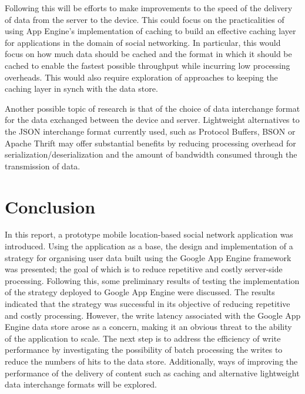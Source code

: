 \documentclass{article}
\begin{document}
Following this will be efforts to make improvements to the speed of the delivery of data from the server to the device. This could focus on the practicalities of using App Engine's implementation of caching to build an effective caching layer for applications in the domain of social networking. In particular, this would focus on how much data should be cached and the format in which it should be cached to enable the fastest possible throughput while incurring low processing overheads. This would also require exploration of approaches to keeping the caching layer in synch with the data store.

Another possible topic of research is that of the choice of data interchange format for the data exchanged between the device and server. Lightweight alternatives to the JSON interchange format currently used, such as Protocol Buffers, BSON or Apache Thrift may offer substantial benefits by reducing processing overhead for serialization/deserialization and the amount of bandwidth consumed through the transmission of data.



\section{Conclusion} %
\label{sec:conclusion}

In this report, a prototype mobile location-based social network application was introduced. Using the application as a base, the design and implementation of a strategy for organising user data built using the Google App Engine framework was presented; the goal of which is to reduce repetitive and costly server-side processing. Following this, some preliminary results of testing the implementation of the strategy deployed to Google App Engine were discussed. The results indicated that the strategy was successful in its objective of reducing repetitive and costly processing. However, the write latency associated with  the Google App Engine data store arose as a concern, making it an obvious threat to the ability of the application to scale. The next step is to address the efficiency of write performance by investigating the possibility of batch processing the writes to reduce the numbers of hits to the data store. Additionally, ways of improving the performance of the delivery of content such as caching and alternative lightweight data interchange formats will be explored.

\end{document}
